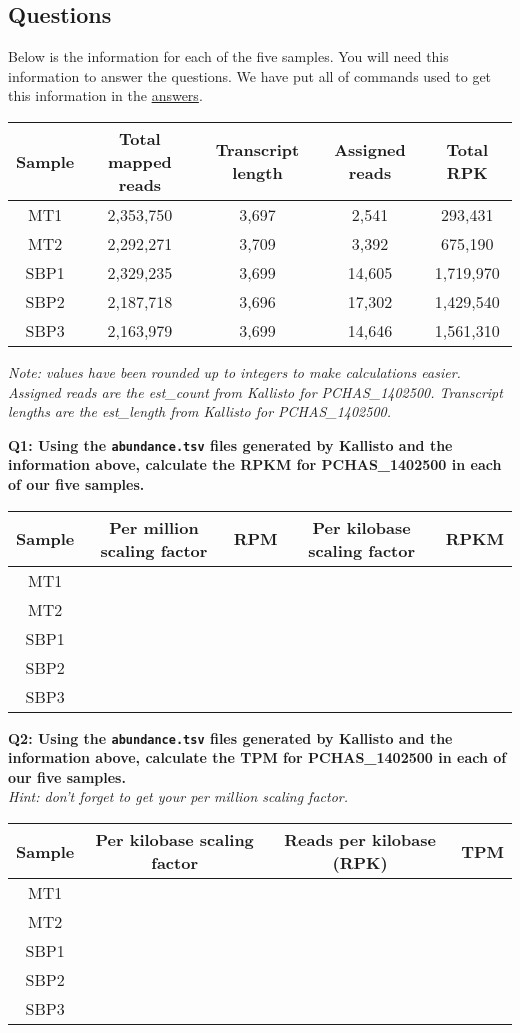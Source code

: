 \documentclass[11pt]{article}
\begin{document}
    \hypertarget{questions}{%
\subsection{Questions}\label{questions}}

Below is the information for each of the five samples. You will need
this information to answer the questions. We have put all of commands
used to get this information in the \href{aanswers.ipynb}{answers}.

\begin{longtable}[]{@{}ccccc@{}}
\hline
Sample & Total mapped reads & Transcript length & Assigned reads & Total
RPK\tabularnewline
\hline
\endhead
MT1 & 2,353,750 & 3,697 & 2,541 & 293,431\tabularnewline
MT2 & 2,292,271 & 3,709 & 3,392 & 675,190\tabularnewline
SBP1 & 2,329,235 & 3,699 & 14,605 & 1,719,970\tabularnewline
SBP2 & 2,187,718 & 3,696 & 17,302 & 1,429,540\tabularnewline
SBP3 & 2,163,979 & 3,699 & 14,646 & 1,561,310\tabularnewline
\hline
\end{longtable}

\textit{Note: values have been rounded up to integers to make calculations
easier. Assigned reads are the est\_count from Kallisto for
PCHAS\_1402500. Transcript lengths are the est\_length from Kallisto for
PCHAS\_1402500.}

\textbf{Q1: Using the \texttt{abundance.tsv} files generated by Kallisto
and the information above, calculate the RPKM for PCHAS\_1402500 in each
of our five samples.}

\begin{longtable}[]{@{}ccccc@{}}
\hline
Sample & Per million scaling factor & RPM & Per kilobase scaling factor
& RPKM\tabularnewline
\hline
\endhead
MT1 & & & &\tabularnewline
MT2 & & & &\tabularnewline
SBP1 & & & &\tabularnewline
SBP2 & & & &\tabularnewline
SBP3 & & & &\tabularnewline
\hline
\end{longtable}

\textbf{Q2: Using the \texttt{abundance.tsv} files generated by Kallisto
and the information above, calculate the TPM for PCHAS\_1402500 in each
of our five samples.}\\
\textit{Hint: don't forget to get your per million scaling factor.}

\begin{longtable}[]{@{}cccc@{}}
\hline
Sample & Per kilobase scaling factor & Reads per kilobase (RPK) &
TPM\tabularnewline
\hline
\endhead
MT1 & & &\tabularnewline
MT2 & & &\tabularnewline
SBP1 & & &\tabularnewline
SBP2 & & &\tabularnewline
SBP3 & & &\tabularnewline
\hline
\end{longtable}
\end{document}

